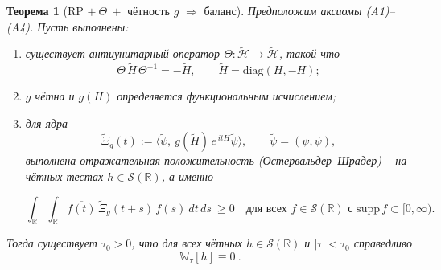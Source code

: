 \documentclass{article}
\numberwithin{equation}{section}
\theoremstyle{plain}
\newtheorem{theorem}{Теорема}
\theoremstyle{definition}
\theoremstyle{remark}
\def\infty{∞}\def\partial{∂}\def\sum{Σ}\def\int{∫}%
\begin{document}
\begin{theorem}[RP $+\ \Theta\ +$ чётность $g$ $\Longrightarrow$ баланс]
\label{thm:RP-implies-balance}
Предположим аксиомы \textnormal{(A1)–(A4)}. Пусть выполнены:
\begin{enumerate}
\item[\textnormal{(i)}] существует антиунитарный оператор $\Theta:\widetilde{\mathcal H}\to\widetilde{\mathcal H}$, такой что
\begin{equation}
\label{eq:theta-anti}
\Theta\,\widetilde H\,\Theta^{-1}=-\widetilde H,\qquad 
\widetilde H=\mathrm{diag}(H,-H);
\end{equation}
\item[\textnormal{(ii)}] $g$ чётна и $g(H)$ определяется функциональным исчислением;
\item[\textnormal{(iii)}] для ядра
\begin{equation}
\label{eq:Xi-tilde}
\widetilde\Xi_g(t):=\langle \widetilde\psi,\ g(\widetilde H)\,e^{\,it\widetilde H}\widetilde\psi\rangle,
\qquad \widetilde\psi=(\psi,\psi),
\end{equation}
выполнена отражательная положительность (Остервальдер–Шрадер) ~\cite{Osterwalder1973} на чётных тестах $h\in\mathcal S(\mathbb R)$, а именно

\begin{equation}
\label{eq:OS}
\int_{\mathbb R}\!\!\int_{\mathbb R} 
\overline{f(t)}\,\widetilde\Xi_g(t+s)\,f(s)\ dt\,ds\ \ge 0
\quad\text{для всех $f\in\mathcal S(\mathbb R)$ с } \mathrm{supp}\,f\subset[0,\infty).
\end{equation}
\end{enumerate}
Тогда существует $\tau_0>0$, что для всех чётных $h\in\mathcal S(\mathbb R)$ и $|\tau|<\tau_0$ справедливо
\begin{equation}
\label{eq:RP-balance}
\boxed{\ \mathbb W_\tau[h]\equiv 0\ .}
\end{equation}
\end{theorem}
\end{document}
